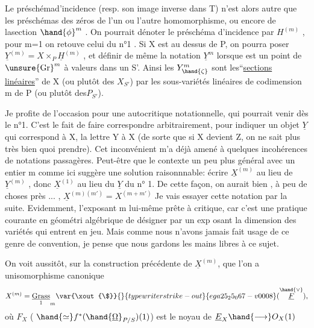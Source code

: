 
Le préschémad'incidence  (resp. son image inverse dans T) n'est alors
autre que les préschémas des zéros de l'un ou l'autre homomorphisme,
ou encore de lasection $\hand{\phi}^{m}$ .  On pourrait dénoter le préschéma
d'incidence par $H^{(m)}$ , pour m=1 on retouve celui du n°1 .  Si X est
au dessus de P, on pourra poser $\underline{Y}^{(m)} = X\times_{P} \underline{H}^{(m)}$ ,  et définir de même
la notation $\underline{Y}^{m}$ lorsque \hand{$\zeta$} est un point de $\unsure{\mathrm{Gr}}^{m}$ à valeurs dans un S'.
Ainsi les  $Y^{m}_{\hand{\zeta}}$  sont les``\uline{sections} \uline{linéaires}''  de X  (ou plutôt des
$X_{S'}$)   par les sous-variétés linéaires de codimension m de P (ou
plutôt des$P_{S'}$).

Je profite de l'occasion pour une  autocritique notationnelle,
qui pourrait venir dès le n°1. C'est le fait  de faire correspondre
arbitrairement, pour indiquer un objet $\underline{Y}$ qui correspond à X, la lettre
Y à X  (de sorte que si X devient Z, on ne sait plus très bien quoi
prendre). Cet inconvénient m'a déjà amené à quelques incohérences de
notations passagères.  Peut-être que le contexte un peu plus général
avec un entier m comme ici suggère une solution raisonnnable: écrire
$\underline{X}^{(m)}$ au lieu de  $\underline{Y}^{(m)}$ , donc  $\underline{X}^{(1)}$ au lieu du  $\underline{Y}$  du n° 1. De cette
façon, on  aurait bien , à peu de choses près ... ,  $\underline{X}^{(m)(m')} = X^{(m+m')}$
Je vais essayer cette notation par la suite.  Evidemment, l'exposant m
lui-même prête à critique, car  c'est une pratique courante en géométri
algébrique de désigner par un exp osant la dimension des variétés qui
entrent en jeu. Mais comme nous n'avons jamais fait usage de ce genre
de convention, je pense que nous gardons les mains libres à ce sujet.

On voit aussitôt, sur la construction précédente de $\underline{X}^{(m)}$, que
l'on a unisomorphisme canonique
\[ X^{(m)} = \underset{1}{\underline{\mathrm{Grass}}}_{m}\var{\xout{\$}}{}{typewriter strike-out}{ega25_25_067-v0008}(\overset{\hand{\vee}}{\underline{F}}) , \]
où  $F_{X}$  ( $\hand{\simeq} f^{*}(\hand{\underline{\Omega}}_{P/S})(1)$)   est le noyau de  $\underline{E}_{X} \hand{\longrightarrow} O_{X}(1)$\hand{,}

